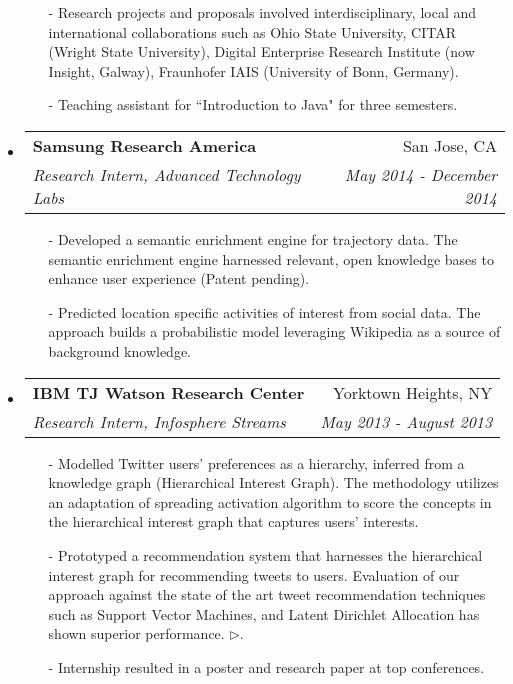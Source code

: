 \documentclass[letterpaper,9pt]{article}
\makeatletter
\newcommand{\ressubheading}[4]{
\begin{tabular*}{7.0in}{l@{\extracolsep{\fill}}r}
		\textbf{#1} & #2 \\
		\textit{#3} & \textit{#4} \\
\end{tabular*}\vspace{-6pt}}
\makeatother
\begin{document}
\begin{itemize}
\begin{itemize}
\item[-] \justify Research projects and proposals involved interdisciplinary, local and international collaborations such as Ohio State University, CITAR (Wright State University), Digital Enterprise Research Institute (now Insight, Galway), Fraunhofer IAIS (University of Bonn, Germany). 
	
\item[-] Teaching assistant for ``Introduction to Java" for three semesters. 

\end{itemize}

\item
\ressubheading{Samsung Research America}{San Jose, CA}{Research Intern, Advanced Technology Labs}{May 2014 - December 2014}
\begin{itemize}
\item[-] Developed a semantic enrichment engine for trajectory data. The semantic enrichment engine harnessed relevant, open knowledge bases to enhance user experience (Patent pending). 
\item[-] Predicted location specific activities of interest from social data. The approach builds a probabilistic model leveraging Wikipedia as a source of background knowledge.    
\end{itemize}

\item 
\ressubheading{IBM TJ Watson Research Center}{Yorktown Heights, NY}{Research Intern, Infosphere Streams}{May 2013 - August 2013} 
\begin{itemize}
\item[-] Modelled Twitter users' preferences as a hierarchy, inferred from a knowledge graph (Hierarchical Interest Graph). The methodology utilizes an adaptation of spreading activation algorithm to score the concepts in the hierarchical interest graph that captures users' interests. 
\item[-] Prototyped a recommendation system that harnesses the hierarchical interest graph for recommending tweets to users. Evaluation of our approach against the state of the art tweet recommendation techniques such as Support Vector Machines, and Latent Dirichlet Allocation has shown superior performance.  \href{http://wiki.knoesis.org/index.php/Hierarchical_Interest_Graph}{$\triangleright$}.
\item[-] Internship resulted in a poster and research paper at top conferences. 
\end{itemize}


\end{itemize}
\end{document}
